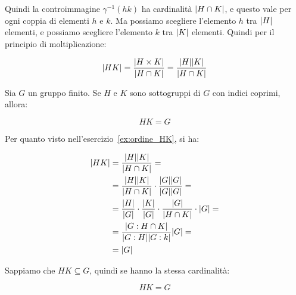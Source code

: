 \begin{soluzione}
	Quindi la controimmagine $\gamma^{-1}(hk)$ ha cardinalità $\lvert H \cap K \rvert$, e questo vale per ogni coppia di elementi $h$ e $k$. Ma possiamo scegliere l'elemento $h$ tra $\lvert H \rvert$ elementi, e possiamo scegliere l'elemento $k$ tra $\lvert K \rvert$ elementi. Quindi per il principio di moltiplicazione:
	
	\begin{equation}
		\lvert HK \rvert = \dfrac{\lvert H \times K \rvert}{\lvert H \cap K \rvert} = \dfrac{\lvert H \rvert\lvert K \rvert}{\lvert H \cap K \rvert}
	\end{equation}

\end{soluzione}

\begin{esercizio}
	Sia $G$ un gruppo finito. Se $H$ e $K$ sono sottogruppi di $G$ con indici coprimi, allora:
	
	\begin{equation}
		HK = G
	\end{equation}
\end{esercizio}
\begin{soluzione}
	Per quanto visto nell'esercizio~\ref{ex:ordine_HK}, si ha:
	
	\begin{align}
		\lvert HK \rvert 
		&= \dfrac{\lvert H \rvert\lvert K \rvert}{\lvert H \cap K \rvert} = \\
		&= \dfrac{\lvert H \rvert\lvert K \rvert}{\lvert H \cap K \rvert} \cdot \dfrac{\lvert G \rvert\lvert G \rvert}{\lvert G \rvert\lvert G \rvert} = \\
		&= \dfrac{\lvert H \rvert}{\lvert G \rvert} \cdot \dfrac{\lvert K \rvert}{\lvert G \rvert}\cdot\dfrac{\lvert G \rvert}{\lvert H \cap K \rvert} \cdot \lvert G \rvert = \\
		&= \dfrac{\lvert G:H \cap K \rvert}{\lvert G:H \rvert\lvert G:k \rvert}\lvert G \rvert = \\
		&= \lvert G \rvert
	\end{align}

	Sappiamo che $HK \subseteq G$, quindi se hanno la stessa cardinalità:
	
	\begin{equation}
		HK = G
	\end{equation}
\end{soluzione}